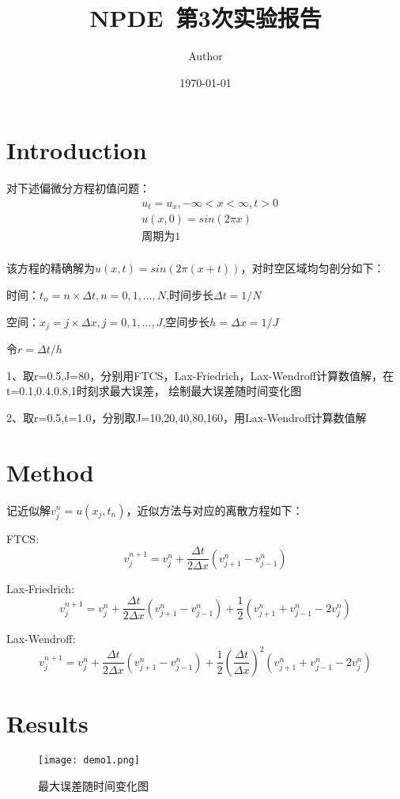 \documentclass{article}
\title{NPDE~第3次实验报告}
\author{Author}
\date{\today}
\begin{document}
\maketitle

\section{Introduction}

对下述偏微分方程初值问题：
$$
\begin{aligned}
    &u_t=u_x,-\infty<x<\infty,t>0\\
    &u(x,0)=sin(2\pi x)\\
    &\text{周期为1}\\
\end{aligned}
$$

该方程的精确解为$u(x,t)=sin(2\pi(x+t))$，对时空区域均匀剖分如下：

时间：$t_n=n\times \Delta t,n=0,1,...,N$,时间步长$\Delta t=1/N$

空间：$x_j=j\times \Delta x,j=0,1,...,J$,空间步长$h=\Delta x=1/J$

令$r=\Delta t/h$

1、取r=0.5,J=80，分别用FTCS，Lax-Friedrich，Lax-Wendroff计算数值解，在t=0.1,0.4,0.8,1时刻求最大误差，
绘制最大误差随时间变化图

2、取r=0.5,t=1.0，分别取J=10,20,40,80,160，用Lax-Wendroff计算数值解
\section{Method}

记近似解$v_j^n=u(x_j,t_n)$，近似方法与对应的离散方程如下：

FTCS:$$v_j^{n+1}=v_j^n+\frac{\Delta t}{2\Delta x}(v_{j+1}^n-v_{j-1}^n)$$

Lax-Friedrich:$$v_j^{n+1}=v_j^n+\frac{\Delta t}{2\Delta x}(v_{j+1}^n-v_{j-1}^n)+\frac{1}{2}(v_{j+1}^n+v_{j-1}^n-2v_j^n)$$

Lax-Wendroff:$$v_j^{n+1}=v_j^n+\frac{\Delta t}{2\Delta x}(v_{j+1}^n-v_{j-1}^n)+\frac{1}{2}(\frac{\Delta t}{\Delta x})^2(v_{j+1}^n+v_{j-1}^n-2v_j^n)$$

\section{Results}

\begin{figure}[H]
    \centering
    \texttt{[image: demo1.png]}
    \caption{最大误差随时间变化图}\label{fig:demo1}
\end{figure}
\end{document}
